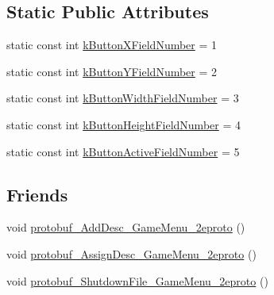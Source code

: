 \subsection*{Static Public Attributes}
\begin{DoxyCompactItemize}
\item 
static const int \hyperlink{class_game_menu_abe2fdf1262f6916050a5bcca9222486a}{k\-Button\-X\-Field\-Number} = 1
\item 
static const int \hyperlink{class_game_menu_ae3096491e0598302630a930f29280b6c}{k\-Button\-Y\-Field\-Number} = 2
\item 
static const int \hyperlink{class_game_menu_a9005124c7b657675f79d175b758bbfd3}{k\-Button\-Width\-Field\-Number} = 3
\item 
static const int \hyperlink{class_game_menu_aa4c6206a7f24f81750af4160e871d5ba}{k\-Button\-Height\-Field\-Number} = 4
\item 
static const int \hyperlink{class_game_menu_abf765ea4cffd8e765a7643700214676a}{k\-Button\-Active\-Field\-Number} = 5
\end{DoxyCompactItemize}
\subsection*{Friends}
\begin{DoxyCompactItemize}
\item 
void \hyperlink{class_game_menu_adab92a19f73074ecd5246095c9c960b4}{protobuf\-\_\-\-Add\-Desc\-\_\-\-Game\-Menu\-\_\-2eproto} ()
\item 
void \hyperlink{class_game_menu_a510004e21d3b33f46c1dd043a543e933}{protobuf\-\_\-\-Assign\-Desc\-\_\-\-Game\-Menu\-\_\-2eproto} ()
\item 
void \hyperlink{class_game_menu_aa91d1c6168e6662eb7667848e4cef2c3}{protobuf\-\_\-\-Shutdown\-File\-\_\-\-Game\-Menu\-\_\-2eproto} ()
\end{DoxyCompactItemize}


